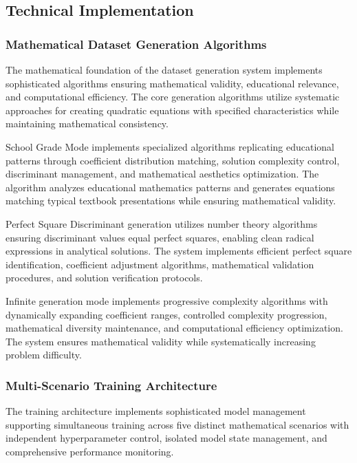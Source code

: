 \documentclass[11pt,a4paper]{report}
\begin{document}
\subsection{Technical Implementation}

\subsubsection{Mathematical Dataset Generation Algorithms}

The mathematical foundation of the dataset generation system implements sophisticated algorithms ensuring mathematical validity, educational relevance, and computational efficiency. The core generation algorithms utilize systematic approaches for creating quadratic equations with specified characteristics while maintaining mathematical consistency.

School Grade Mode implements specialized algorithms replicating educational patterns through coefficient distribution matching, solution complexity control, discriminant management, and mathematical aesthetics optimization. The algorithm analyzes educational mathematics patterns and generates equations matching typical textbook presentations while ensuring mathematical validity.

Perfect Square Discriminant generation utilizes number theory algorithms ensuring discriminant values equal perfect squares, enabling clean radical expressions in analytical solutions. The system implements efficient perfect square identification, coefficient adjustment algorithms, mathematical validation procedures, and solution verification protocols.

Infinite generation mode implements progressive complexity algorithms with dynamically expanding coefficient ranges, controlled complexity progression, mathematical diversity maintenance, and computational efficiency optimization. The system ensures mathematical validity while systematically increasing problem difficulty.

\subsubsection{Multi-Scenario Training Architecture}

The training architecture implements sophisticated model management supporting simultaneous training across five distinct mathematical scenarios with independent hyperparameter control, isolated model state management, and comprehensive performance monitoring.
\end{document}
